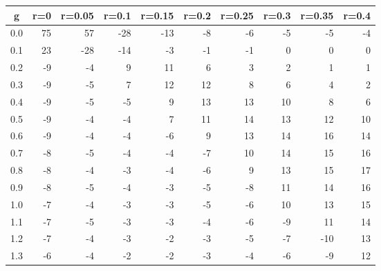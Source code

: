 %
\begin{table}[!tbp]
 \begin{center}
 \begin{tabular}{rrrrrrrrrr}\hline\hline
\multicolumn{1}{c}{g}&\multicolumn{1}{c}{r=0}&\multicolumn{1}{c}{r=0.05}&\multicolumn{1}{c}{r=0.1}&\multicolumn{1}{c}{r=0.15}&\multicolumn{1}{c}{r=0.2}&\multicolumn{1}{c}{r=0.25}&\multicolumn{1}{c}{r=0.3}&\multicolumn{1}{c}{r=0.35}&\multicolumn{1}{c}{r=0.4}\tabularnewline
\hline
0.0&75& 57&-28&-13&-8&-6&-5& -5&-4\tabularnewline
0.1&23&-28&-14& -3&-1&-1& 0&  0& 0\tabularnewline
0.2&-9& -4&  9& 11& 6& 3& 2&  1& 1\tabularnewline
0.3&-9& -5&  7& 12&12& 8& 6&  4& 2\tabularnewline
0.4&-9& -5& -5&  9&13&13&10&  8& 6\tabularnewline
0.5&-9& -4& -4&  7&11&14&13& 12&10\tabularnewline
0.6&-9& -4& -4& -6& 9&13&14& 16&14\tabularnewline
0.7&-8& -5& -4& -4&-7&10&14& 15&16\tabularnewline
0.8&-8& -4& -3& -4&-6& 9&13& 15&17\tabularnewline
0.9&-8& -5& -4& -3&-5&-8&11& 14&16\tabularnewline
1.0&-7& -4& -3& -3&-5&-6&10& 13&15\tabularnewline
1.1&-7& -5& -3& -3&-4&-6&-9& 11&14\tabularnewline
1.2&-7& -4& -3& -2&-3&-5&-7&-10&13\tabularnewline
1.3&-6& -4& -2& -2&-3&-4&-6& -9&12\tabularnewline
\hline
\end{tabular}

\end{center}

\end{table}

